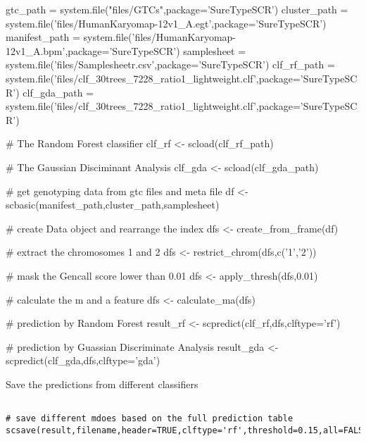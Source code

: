 \documentclass[a4paper]{book}
\begin{document}
\begin{Examples}
\begin{ExampleCode}

gtc_path = system.file("files/GTCs",package='SureTypeSCR')
cluster_path = system.file('files/HumanKaryomap-12v1_A.egt',package='SureTypeSCR')
manifest_path = system.file('files/HumanKaryomap-12v1_A.bpm',package='SureTypeSCR')
samplesheet = system.file('files/Samplesheetr.csv',package='SureTypeSCR')
clf_rf_path = system.file('files/clf_30trees_7228_ratio1_lightweight.clf',package='SureTypeSCR')
clf_gda_path = system.file('files/clf_30trees_7228_ratio1_lightweight.clf',package='SureTypeSCR')



# The Random Forest classifier
clf_rf <- scload(clf_rf_path) 

# The Gaussian Disciminant Analysis
clf_gda <- scload(clf_gda_path) 

# get genotyping data from gtc files and meta file
df <- scbasic(manifest_path,cluster_path,samplesheet)
 
# create Data object and rearrange the index 
dfs <- create_from_frame(df) 

# extract the chromosomes 1 and 2
dfs <- restrict_chrom(dfs,c('1','2')) 

# mask the Gencall score lower than 0.01
dfs <- apply_thresh(dfs,0.01) 

# calculate the m and a feature
dfs <- calculate_ma(dfs) 

# prediction by Random Forest
result_rf <- scpredict(clf_rf,dfs,clftype='rf')

# prediction by Guassian Discriminate Analysis
result_gda <- scpredict(clf_gda,dfs,clftype='gda')


\end{ExampleCode}
\end{Examples}
%
\begin{Description}\relax
Save the predictions from different classifiers
\end{Description}
%
\begin{Usage}
\begin{verbatim}

# save different mdoes based on the full prediction table 
scsave(result,filename,header=TRUE,clftype='rf',threshold=0.15,all=FALSE) 

\end{verbatim}
\end{Usage}
\end{document}
